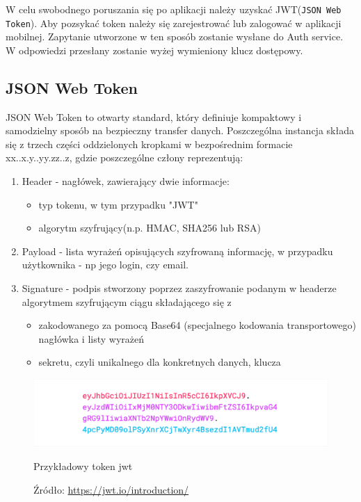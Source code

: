 W celu swobodnego poruszania się po aplikacji należy uzyskać JWT(\texttt{JSON Web Token}). Aby pozsykać token należy się zarejestrować lub zalogować w aplikacji mobilnej. Zapytanie utworzone w ten sposób zostanie wysłane do Auth service. W odpowiedzi przesłany zostanie wyżej wymieniony klucz dostępowy.

\subsection{JSON Web Token}

JSON Web Token to otwarty standard, który definiuje kompaktowy i samodzielny sposób na bezpieczny transfer danych. Poszczególna instancja składa się z trzech części oddzielonych kropkami w bezpośrednim formacie xx..x.y..yy.zz..z, gdzie poszczególne człony reprezentują:~\cite{jwt}
\begin{enumerate}%
	\item Header - nagłówek, zawierający dwie informacje:
		\begin{itemize}
			\item typ tokenu, w tym przypadku "JWT"
			\item algorytm szyfrujący(n.p. HMAC, SHA256 lub RSA)
		\end{itemize}

	\item Payload - lista wyrażeń opisujących szyfrowaną informację, w przypadku użytkownika - np jego login, czy email.
	
	\item Signature - podpis stworzony poprzez zaszyfrowanie podanym w headerze algorytmem szyfrującym ciągu składającego się z
	\begin{itemize}
		\item zakodowanego za pomocą Base64 (specjalnego kodowania transportowego) nagłówka i listy wyrażeń
		\item sekretu, czyli unikalnego dla konkretnych danych, klucza
	\end{itemize}
	\end{enumerate}

	\begin{figure}[H]
		\centering
		\includegraphics[width=\linewidth]{json-token.pdf}
		\caption{Przykładowy token jwt~\cite{jwt}}
		\caption*{Źródło: \url{https://jwt.io/introduction/}}
	\end{figure}

